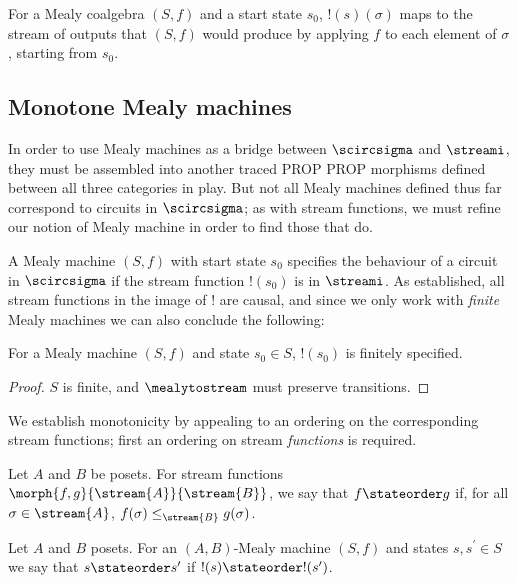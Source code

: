 For a Mealy coalgebra \((S, f)\) and a start state \(s_0\),
\(!(s)(\sigma)\) maps to the stream of outputs that \((S, f)\) would produce
by applying \(f\) to each element of \(\sigma\), starting from \(s_0\).

\subsection{Monotone Mealy machines}

In order to use Mealy machines as a bridge between \(\scircsigma\) and
\(\streami\), they must be assembled into another traced PROP
PROP morphisms defined between all three categories in play.
But not all Mealy machines defined thus far correspond to circuits in
\(\scircsigma\); as with stream functions, we must refine our notion of Mealy
machine in order to find those that do.

A Mealy machine \((S, f)\) with start state \(s_0\) specifies the behaviour of a
circuit in \(\scircsigma\) if the stream function \(!(s_0)\) is in \(\streami\).
As established, all stream functions in the image of \(!\) are causal, and since
we only work with \emph{finite} Mealy machines we can also conclude the
following:

\begin{lemma}
    For a Mealy machine \((S, f)\) and state \(s_0 \in S\), \(!(s_0)\)
    is finitely specified.
\end{lemma}
\begin{proof}
    \(S\) is finite, and \(\mealytostream\) must preserve transitions.
\end{proof}

We establish monotonicity by appealing to an ordering on the corresponding
stream functions; first an ordering on stream \emph{functions} is required.

\begin{definition}
    Let \(A\) and \(B\) be posets.
    For stream functions \(\morph{f,g}{\stream{A}}{\stream{B}}\), we say that
    \(f \stateorder g\) if, for all \(\sigma \in \stream{A}\),
    \(f(\sigma) \leq_{\stream{B}} g(\sigma)\).
\end{definition}

\begin{definition}
    Let \(A\) and \(B\) posets.
    For an \((A,B)\)-Mealy machine \((S, f)\) and states \(s,s^\prime \in S\)
    we say that \(s \stateorder s^\prime\) if \(!(s) \stateorder !(s^\prime)\).
\end{definition}

